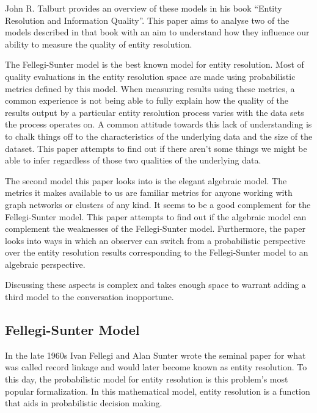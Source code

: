 \documentclass[journal]{IEEEtran}
\begin{document}
    John R. Talburt provides an overview of these models in his book ``Entity
    Resolution and Information Quality''\cite{Tal11}.
    This paper aims to analyse two of the models described in that book with an
    aim to understand how they influence our ability to measure the quality of
    entity resolution.

    The Fellegi-Sunter model is the best known model for entity resolution.
    Most of quality evaluations in the entity resolution space are made using
    probabilistic metrics defined by this model.
    When measuring results using these metrics, a common experience is not being
    able to fully explain how the quality of the results output by a particular
    entity resolution process varies with the data sets the process operates on.
    A common attitude towards this lack of understanding is to chalk things off
    to the characteristics of the underlying data and the size of the dataset.
    This paper attempts to find out if there aren't some things we might be able
    to infer regardless of those two qualities of the underlying data.

    The second model this paper looks into is the elegant algebraic model.
    The metrics it makes available to us are familiar metrics for anyone working
    with graph networks or clusters of any kind.
    It seems to be a good complement for the Fellegi-Sunter model.
    This paper attempts to find out if the algebraic model can complement the
    weaknesses of the Fellegi-Sunter model.
    Furthermore, the paper looks into ways in which an observer can switch from
    a probabilistic perspective over the entity resolution results corresponding
    to the Fellegi-Sunter model to an algebraic perspective.

    Discussing these aspects is complex and takes enough space to warrant adding
    a third model to the conversation inopportune.

    \subsection[fsm]{Fellegi-Sunter Model}\label{subsec:fsm}

    In the late 1960s Ivan Fellegi and Alan Sunter wrote the seminal
    paper\cite{fs1969} for what was called record linkage and would later become
    known as entity resolution.
    To this day, the probabilistic model for entity resolution is this problem's
    most popular formalization.
    In this mathematical model, entity resolution is a function that aids in 
    probabilistic decision making.
    
\end{document}
